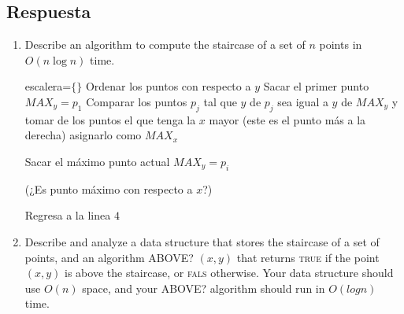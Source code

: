 \subsection*{Respuesta}
\begin{enumerate}
    \item Describe an algorithm to compute the staircase of a set of $n$ points in $O(n \log n)$ time.
    \begin{algorithmic}[1]
        \State escalera=$\{\}$
        \State Ordenar los puntos con respecto a $y$
        \State Sacar el primer punto $MAX_y = p_1$
        \State Comparar los puntos $p_j$ tal que $y$ de $p_j$ sea igual a $y$ de $MAX_y$ y tomar de los puntos el que tenga la $x$ mayor (este es el punto más a la derecha) asignarlo como $MAX_x$ 

        \State  Sacar el máximo punto actual $MAX_y = p_i$

         (¿Es punto máximo con respecto a $x$?)

        \State Regresa a la linea $4$

        \State
        \EndIf
        \end{algorithmic}
    
    \item Describe and analyze a data structure that stores the staircase of a set of points, and an algorithm ABOVE? $(x, y)$ that returns \textsc{true} if the point $(x, y)$ is above the staircase, or \textsc{fals} otherwise. Your data structure should use $O(n)$ space, and your ABOVE? algorithm should run in $O(log n)$ time.
\end{enumerate}
\bigskip

